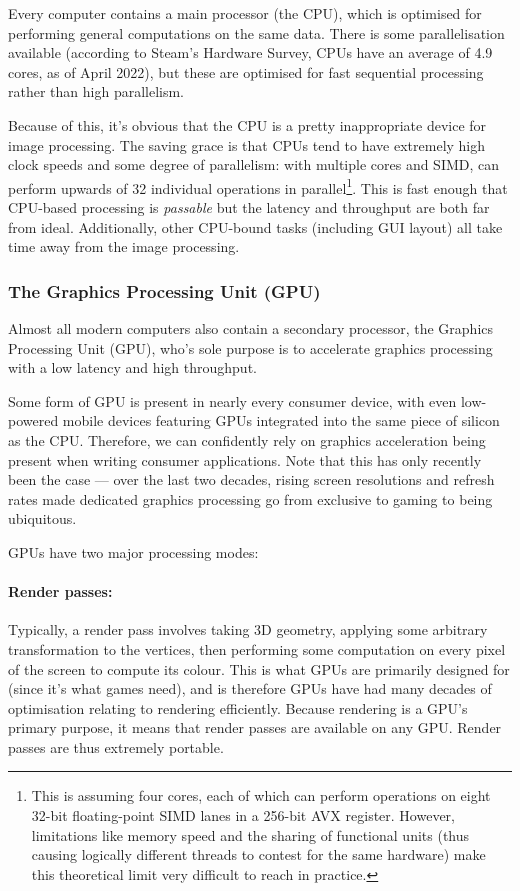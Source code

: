 \documentclass[12pt]{article}
\begin{document}
Every computer contains a main processor (the CPU), which is optimised for performing general
computations on the same data.  There is some parallelisation available (according to Steam's
Hardware Survey, CPUs have an average of 4.9 cores, as of April 2022), but these are optimised for
fast sequential processing rather than high parallelism.

Because of this, it's obvious that the CPU is a pretty inappropriate device for image processing.
The saving grace is that CPUs tend to have extremely high clock speeds and some degree of
parallelism: with multiple cores and SIMD, can perform upwards of 32 individual operations in
parallel\footnote{This is assuming four cores, each of which can perform operations on eight 32-bit
floating-point SIMD lanes in a 256-bit AVX register.  However, limitations like memory speed and the
sharing of functional units (thus causing logically different threads to contest for the same
hardware) make this theoretical limit very difficult to reach in practice.}.  This is fast enough
that CPU-based processing is \emph{passable} but the latency and throughput are both far from ideal.
Additionally, other CPU-bound tasks (including GUI layout) all take time away from the image
processing.

\subsubsection{The Graphics Processing Unit (GPU)}

Almost all modern computers also contain a secondary processor, the Graphics Processing Unit (GPU),
who's sole purpose is to accelerate graphics processing with a low latency and high throughput.

Some form of GPU is present in nearly every consumer device, with even low-powered mobile devices
featuring GPUs integrated into the same piece of silicon as the CPU.  Therefore, we can confidently
rely on graphics acceleration being present when writing consumer applications.  Note that this has
only recently been the case --- over the last two decades, rising screen resolutions and refresh
rates made dedicated graphics processing go from exclusive to gaming to being ubiquitous.

GPUs have two major processing modes:

\paragraph{Render passes:} Typically, a render pass involves taking 3D geometry, applying some
arbitrary transformation to the vertices, then performing some computation on every pixel of the
screen to compute its colour.  This is what GPUs are primarily designed for (since it's what games
need), and is therefore GPUs have had many decades of optimisation relating to rendering
efficiently.  Because rendering is a GPU's primary purpose, it means that render passes are
available on any GPU.  Render passes are thus extremely portable.
\end{document}
